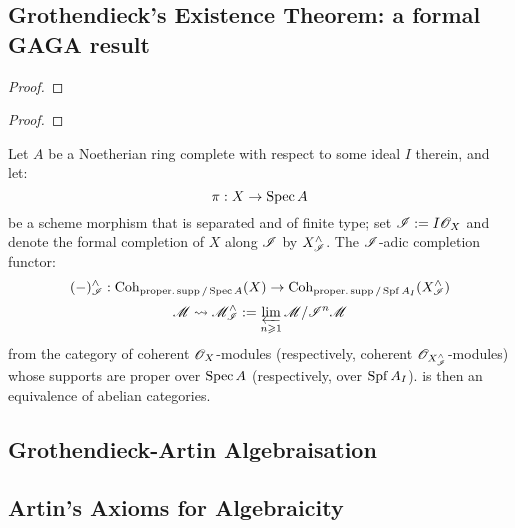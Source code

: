         \subsection{Grothendieck's Existence Theorem: a formal GAGA result}
            \begin{lemma}
                
            \end{lemma}
                \begin{proof}
                    
                \end{proof}
            \begin{lemma}
                
            \end{lemma}
                \begin{proof}
                    
                \end{proof}
            \begin{remark}
                
            \end{remark}
            \begin{theorem}
                Let $A$ be a Noetherian ring complete with respect to some ideal $I$ therein, and let:
                    $$\pi: X \to \operatorname{Spec} A$$
                be a scheme morphism that is separated and of finite type; set $\mathscr{I} := I \mathscr{O}_X$ and denote the formal completion of $X$ along $\mathscr{I}$ by $X^{\wedge}_{\mathscr{I}}$. The $\mathscr{I}$-adic completion functor:
                    $$(-)^{\wedge}_{\mathscr{I}}: \mathrm{Coh}_{\mathrm{proper}.\operatorname{supp}/\operatorname{Spec} A}(X) \to \mathrm{Coh}_{\mathrm{proper}.\operatorname{supp}/\operatorname{Spf} A_I}(X^{\wedge}_{\mathscr{I}})$$
                    $$\mathscr{M} \leadsto \mathscr{M}^{\wedge}_{\mathscr{I}} := \varprojlim_{n \geqslant 1} \mathscr{M}/\mathscr{I}^n\mathscr{M}$$
                from the category of coherent $\mathscr{O}_X$-modules (respectively, coherent $\mathscr{O}_{X^{\wedge}_{\mathscr{I}}}$-modules) whose supports are proper over $\operatorname{Spec} A$ (respectively, over $\operatorname{Spf} A_I$). is then an equivalence of abelian categories.
            \end{theorem}

        \subsection{Grothendieck-Artin Algebraisation}

        \subsection{Artin's Axioms for Algebraicity}
    
    \printbibliography

